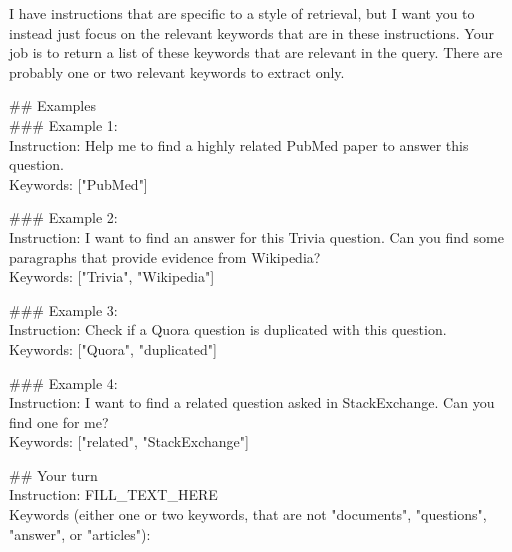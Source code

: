 \documentclass{article} %
\begin{document}
\begin{tcolorbox}[colback=white,colframe=black,title=Short Instructions to Keywords]
I have instructions that are specific to a style of retrieval, but I want you to instead just focus on the relevant keywords that are in these instructions. Your job is to return a list of these keywords that are relevant in the query. There are probably one or two relevant keywords to extract only.

\medskip

\noindent \#\# Examples\\
\#\#\# Example 1:\\
Instruction: Help me to find a highly related PubMed paper to answer this question.\\
Keywords: ["PubMed"]\newline

\smallskip

\noindent \#\#\# Example 2:\\
Instruction: I want to find an answer for this Trivia question. Can you find some paragraphs that provide evidence from Wikipedia?\\
Keywords: ["Trivia", "Wikipedia"]\newline

\smallskip

\noindent \#\#\# Example 3:\\
Instruction: Check if a Quora question is duplicated with this question.\\
Keywords: ["Quora", "duplicated"]\newline

\smallskip

\noindent \#\#\# Example 4:\\
Instruction: I want to find a related question asked in StackExchange. Can you find one for me?\\
Keywords: ["related", "StackExchange"]\newline

\medskip

\noindent \#\# Your turn\\
Instruction: FILL\_TEXT\_HERE\\
Keywords (either one or two keywords, that are not "documents", "questions", "answer", or "articles"): 
\end{tcolorbox}
\end{document}
